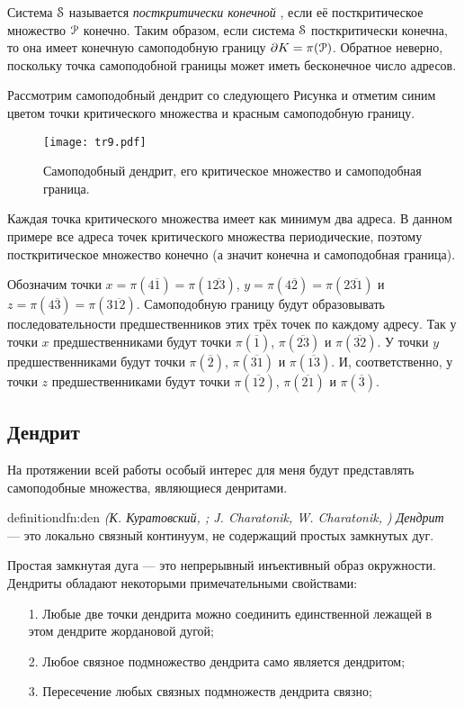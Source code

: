 Система ${\EuScript S}$ называется {\em посткритически конечной} \cite{Kig}, если её посткритическое множество ${\EuScript P}$ конечно. 
Таким образом, если система ${\EuScript S}$ посткритически конечна, то она имеет конечную самоподобную границу $\partial K=\pi({\EuScript P})$.
Обратное неверно, поскольку точка самоподобной границы может иметь бесконечное число адресов.

\begin{example}
Рассмотрим самоподобный дендрит со следующего Рисунка и отметим синим цветом точки критического множества и красным самоподобную границу.
\begin{figure}[h!]
\centering
\texttt{[image: tr9.pdf]}
\caption{Самоподобный дендрит, его критическое множество и самоподобная граница.}
\end{figure}
Каждая точка критического множества имеет как минимум два адреса.
В данном примере все адреса точек критического множества периодические, поэтому посткритическое множество конечно (а значит конечна и самоподобная граница).

Обозначим точки $x=\pi(4\overline{1})=\pi(1\overline{23})$, $y=\pi(4\overline{2})=\pi(2\overline{31})$ и $z=\pi(4\overline{3})=\pi(3\overline{12})$.
Самоподобную границу будут образовывать последовательности предшественников этих трёх точек по каждому адресу.
Так у точки $x$ предшественниками будут точки $\pi(\overline{1})$, $\pi(\overline{23})$ и $\pi(\overline{32}).$
У точки $y$ предшественниками будут точки $\pi(\overline{2})$, $\pi(\overline{31})$ и $\pi(\overline{13}).$
И, соответственно, у точки $z$ предшественниками будут точки $\pi(\overline{12})$, $\pi(\overline{21})$ и $\pi(\overline{3})$.
\end{example}


\subsection{Дендрит}

На протяжении всей работы особый интерес для меня будут представлять самоподобные множества, являющиеся денритами. 

\begin{restatethis}{definition}{dfn:den} %
{\em (К. Куратовский, \cite{Kur1}; J. Charatonik, W. Charatonik, \cite{Char1998})}
{\em Дендрит} --- это локально связный континуум, не содержащий простых замкнутых дуг.     
\end{restatethis}

Простая замкнутая дуга --- это непрерывный инъективный образ окружности.
Дендриты обладают некоторыми примечательными свойствами:
\begin{enumerate}[nolistsep]
\item[1.] Любые две точки дендрита можно соединить единственной лежащей в этом дендрите жордановой дугой;
\item[2.] Любое связное подмножество дендрита само является дендритом;
\item[3.] Пересечение любых связных подмножеств дендрита связно;
\end{enumerate}

